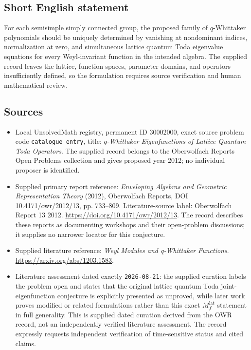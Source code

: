 \documentclass[11pt]{article}
\begin{document}
\subsection{Short English statement}
For each semisimple simply connected group, the proposed family of \(q\)-Whittaker polynomials should be uniquely determined by vanishing at nondominant indices, normalization at zero, and simultaneous lattice quantum Toda eigenvalue equations for every Weyl-invariant function in the intended algebra. The supplied record leaves the lattice, function spaces, parameter domains, and operators insufficiently defined, so the formulation requires source verification and human mathematical review.
\subsection{Sources}
\begin{itemize}
\item Local UnsolvedMath registry, permanent ID \(30002000\), exact source problem code \texttt{catalogue entry}, title: \emph{\(q\)-Whittaker Eigenfunctions of Lattice Quantum Toda Operators}. The supplied record belongs to the Oberwolfach Reports Open Problems collection and gives proposed year 2012; no individual proposer is identified.
\item Supplied primary report reference: \emph{Enveloping Algebras and Geometric Representation Theory} (2012), Oberwolfach Reports, DOI 10.4171/owr/2012/13, pp. 733--809. Literature-source label: Oberwolfach Report 13 2012. \url{https://doi.org/10.4171/owr/2012/13}. The record describes these reports as documenting workshops and their open-problem discussions; it supplies no narrower locator for this conjecture.
\item Supplied literature reference: \emph{Weyl Modules and q-Whittaker Functions}. \url{https://arxiv.org/abs/1203.1583}.
\item Literature assessment dated exactly \texttt{2026-08-21}: the supplied curation labels the problem open and states that the original lattice quantum Toda joint-eigenfunction conjecture is explicitly presented as unproved, while later work proves modified or related formulations rather than this exact \(M_f^{\mathrm{lat}}\) statement in full generality. This is supplied dated curation derived from the OWR record, not an independently verified literature assessment. The record expressly requests independent verification of time-sensitive status and cited claims.
\end{itemize}
\end{document}
